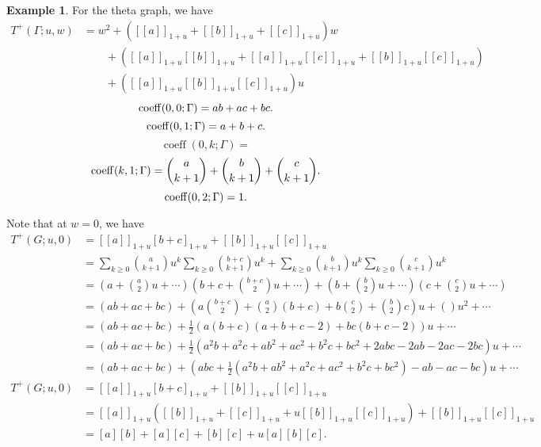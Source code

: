 \documentclass{amsart}
\theoremstyle{definition}
\newtheorem{eg}[thm]{Example}
\DeclareMathOperator{\coeff}{coeff}
\newcommand{\fanalog}[2]{[\![#2]\!]_{#1}}
\begin{document}
\begin{eg}
For the theta graph, we have
\begin{align*}
T^+(\Gamma; u,w) &= w^2 + (\fanalog{1 + u}{a} + \fanalog{1 + u}{b} + \fanalog{1 + u}{c})w  \\
&\qquad + (\fanalog{1 + u}{a} \fanalog{1 + u}{b} + \fanalog{1 + u}{a} \fanalog{1 + u}{c}  + \fanalog{1 + u}{b} \fanalog{1 + u}{c}) \\
&\qquad + (\fanalog{1 + u}{a} \fanalog{1 + u}{b} \fanalog{1 + u}{c})u
\end{align*}
$$ {\rm coeff}(0,0; \Gamma) = ab + ac + bc .$$
$$ {\rm coeff}(0,1; \Gamma) = a + b + c .$$
$$ \coeff(0,k; \Gamma) = $$
$$ {\rm coeff}(k,1; \Gamma) = \binom{a}{k+1} + \binom{b}{k+1} + \binom{c}{k+1} .$$
$$ {\rm coeff}(0,2; \Gamma) = 1 .$$

Note that at $w = 0$, we have
\begin{align*}
T^+(G;u,0) &= \fanalog{1 + u}{a} [b+c]_{1+u} + \fanalog{1 + u}{b}\fanalog{1 + u}{c} \\
&= \sum_{k\geq 0}\binom{a}{k+1}u^k \sum_{k\geq 0} \binom{b+c}{k+1}u^k + \sum_{k\geq 0}\binom{b}{k+1}u^k \sum_{k\geq 0}\binom{c}{k+1}u^k \\
&= \left( a + \binom{a}{2}u + \cdots\right) \left(b + c + \binom{b+c}{2} u + \cdots\right) + \left(b + \binom{b}{2}u + \cdots\right) \left(c + \binom{c}{2}u + \cdots\right) \\
&= (ab + ac + bc) + \left(a\binom{b+c}{2} + \binom{a}{2}(b+c) + b\binom{c}{2} + \binom{b}{2} c \right)u + () u^2 + \cdots  \\
&= (ab + ac + bc) + \frac12 \left(a(b+c)(a+b+c-2) + bc(b+c-2) \right)u + \cdots \\
&= (ab + ac + bc) + \frac12 \left(a^2b + a^2c +ab^2 +ac^2 + b^2c + bc^2 + 2abc-2ab - 2ac - 2bc \right)u + \cdots \\
&= (ab + ac + bc) + \left(abc + \frac12 (a^2b + ab^2 + a^2c + ac^2 + b^2 c + bc^2) - ab - ac - bc \right)u + \cdots
\end{align*}
\begin{align*}
T^+(G;u,0) &= \fanalog{1 + u}{a} [b+c]_{1+u} + \fanalog{1 + u}{b}\fanalog{1 + u}{c} \\
&= \fanalog{1 + u}{a} \left(\fanalog{1 + u}{b} + \fanalog{1 + u}{c} + u\fanalog{1 + u}{b} \fanalog{1 + u}{c} \right) + \fanalog{1 + u}{b} \fanalog{1 + u}{c} \\
&= [a][b] + [a][c] + [b][c] + u[a][b][c] .
\end{align*}

\end{eg}
\end{document}
